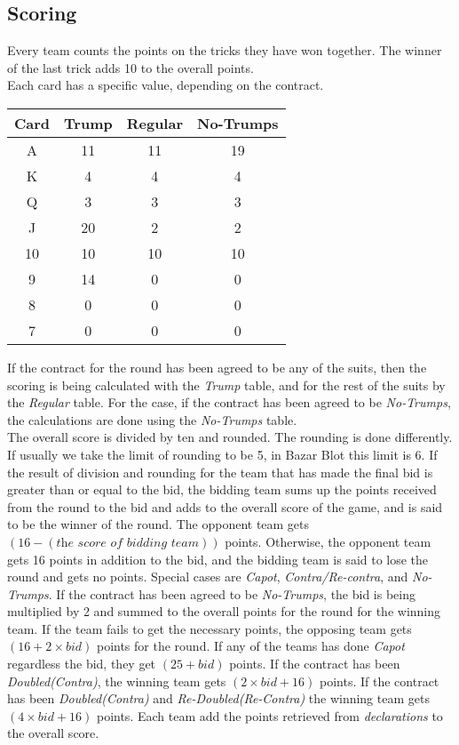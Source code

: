 \subsection{Scoring}
\hspace{\parindent} Every team counts the points on the tricks they have won together.
The winner of the last trick adds 10 to the overall points.\\

Each card has a specific value, depending on the contract.
\begin{center}
    \begin{tabular}{|c|c|c|c|}
    \hline
    \textbf{Card} & \textbf{Trump} & \textbf{Regular} & \textbf{No-Trumps}\\
    \hline
    A & 11 & 11 & 19\\
    \hline
    K & 4 & 4 & 4\\
    \hline
    Q & 3 & 3 & 3\\
    \hline
    J & 20 & 2 & 2\\
    \hline
    10 & 10 & 10 & 10\\
    \hline
    9 & 14 & 0 & 0\\
    \hline
    8 & 0 & 0 & 0\\
    \hline
    7 & 0 & 0 & 0\\
    \hline
\end{tabular}
\end{center}
If the contract for the round has been agreed to be any of the suits, then the scoring is being calculated with the \textit{Trump} table, and for the rest of the suits by the \textit{Regular} table.
For the case, if the contract has been agreed to be \textit{No-Trumps}, the calculations are done using the \textit{No-Trumps} table.\\

The overall score is divided by ten and rounded.
The rounding is done differently.
If usually we take the limit of rounding to be 5, in Bazar Blot this limit is 6.
If the result of division and rounding for the team that has made the final bid is greater than or equal to the bid, the bidding team sums up the points received from the round to the bid and adds to the overall score of the game, and is said to be the winner of the round.
The opponent team gets $(16 - (\textit{the score of bidding team}))$ points.
Otherwise, the opponent team gets 16 points in addition to the bid, and the bidding team is said to lose the round and gets no points.
Special cases are \textit{Capot}, \textit{Contra/Re-contra}, and \textit{No-Trumps}.
If the contract has been agreed to be \textit{No-Trumps}, the bid is being multiplied by 2 and summed to the overall points for the round for the winning team.
If the team fails to get the necessary points, the opposing team gets $(16 + 2 \times bid)$ points for the round.
If any of the teams has done \textit{Capot} regardless the bid, they get $(25+bid)$ points.
If the contract has been \textit{Doubled(Contra)}, the winning team gets $(2\times bid + 16)$ points.
If the contract has been \textit{Doubled(Contra)} and \textit{Re-Doubled(Re-Contra)} the winning team gets $(4\times bid + 16)$ points.
Each team add the points retrieved from \textit{declarations} to the overall score.

